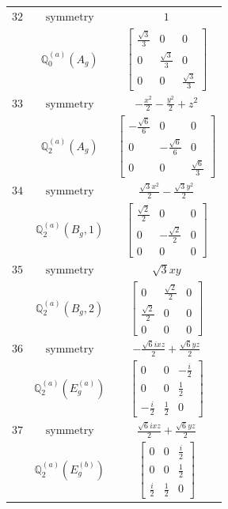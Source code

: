 \documentclass[fleqn,8pt,landscape]{jsarticle}
\begin{document}
\begin{longtable}{ccc}
$ 32 $ & $ \text{symmetry} $ & $ 1 $ \\
$  $ & $ \mathbb{Q}_{0}^{(a)}(A_{g}) $ & $ \begin{bmatrix} \frac{\sqrt{3}}{3} & 0 & 0 \\ 0 & \frac{\sqrt{3}}{3} & 0 \\ 0 & 0 & \frac{\sqrt{3}}{3} \end{bmatrix} $ \\ \hline
$ 33 $ & $ \text{symmetry} $ & $ - \frac{x^{2}}{2} - \frac{y^{2}}{2} + z^{2} $ \\
$  $ & $ \mathbb{Q}_{2}^{(a)}(A_{g}) $ & $ \begin{bmatrix} - \frac{\sqrt{6}}{6} & 0 & 0 \\ 0 & - \frac{\sqrt{6}}{6} & 0 \\ 0 & 0 & \frac{\sqrt{6}}{3} \end{bmatrix} $ \\ \hline
$ 34 $ & $ \text{symmetry} $ & $ \frac{\sqrt{3} x^{2}}{2} - \frac{\sqrt{3} y^{2}}{2} $ \\
$  $ & $ \mathbb{Q}_{2}^{(a)}(B_{g},1) $ & $ \begin{bmatrix} \frac{\sqrt{2}}{2} & 0 & 0 \\ 0 & - \frac{\sqrt{2}}{2} & 0 \\ 0 & 0 & 0 \end{bmatrix} $ \\ \hline
$ 35 $ & $ \text{symmetry} $ & $ \sqrt{3} x y $ \\
$  $ & $ \mathbb{Q}_{2}^{(a)}(B_{g},2) $ & $ \begin{bmatrix} 0 & \frac{\sqrt{2}}{2} & 0 \\ \frac{\sqrt{2}}{2} & 0 & 0 \\ 0 & 0 & 0 \end{bmatrix} $ \\ \hline
$ 36 $ & $ \text{symmetry} $ & $ - \frac{\sqrt{6} i x z}{2} + \frac{\sqrt{6} y z}{2} $ \\
$  $ & $ \mathbb{Q}_{2}^{(a)}(E_{g}^{(a)}) $ & $ \begin{bmatrix} 0 & 0 & - \frac{i}{2} \\ 0 & 0 & \frac{1}{2} \\ - \frac{i}{2} & \frac{1}{2} & 0 \end{bmatrix} $ \\ \hline
$ 37 $ & $ \text{symmetry} $ & $ \frac{\sqrt{6} i x z}{2} + \frac{\sqrt{6} y z}{2} $ \\
$  $ & $ \mathbb{Q}_{2}^{(a)}(E_{g}^{(b)}) $ & $ \begin{bmatrix} 0 & 0 & \frac{i}{2} \\ 0 & 0 & \frac{1}{2} \\ \frac{i}{2} & \frac{1}{2} & 0 \end{bmatrix} $ \\ \hline

\end{longtable}
\end{document}
